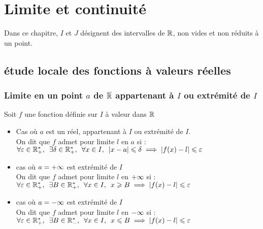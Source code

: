 \chapter{Limite et continuité}

\minitoc
\begin{nota}
    Dans ce chapitre, \(I\) et \(J\) désignent des intervalles de \(\mathbb{R}\), non vides et non réduits à un point.
\end{nota}
\section{étude locale des fonctions à valeurs réelles}
\subsection{Limite en un point \(a\) de \(\overline{\mathbb{R}}\) appartenant à \(I\) ou extrémité de \(I\)}

\begin{defi}
    Soit \(f\) une fonction définie sur \(I\) à  valeur dans \(\mathbb{R}\)
    \begin{itemize}
        \item Cas où \(a\) est un réel, appartenant à \(I\) ou extrémité de \(I\).\\
        On dit que \(f\) admet pour limite \(l\) en \(a\) si : \(\quantifs{\forall \epsilon \in \Rps;\exists\delta \in \Rps;\forall x \in I} \abs{x-a}\leq \delta \imp \abs{f(x)-l}\leq \epsilon\)
        \item cas où \(a = +\infty\) est extrémité de \(I\)\\
            On dit que \(f\) admet pour limite \(l\) en \(+\infty\) si : \(\quantifs{\forall \epsilon \in \Rps;\exists B \in \Rps;\forall x \in I} x\geq B \imp \abs{f(x)-l}\leq \epsilon\)
        \item cas où \(a = -\infty\) est extrémité de \(I\)\\
         On dit que \(f\) admet pour limite \(l\) en \(-\infty\) si : \(\quantifs{\forall \epsilon \in \Rps;\exists B \in \Rms;\forall x \in I} x\leq B \imp \abs{f(x)-l}\leq \epsilon\)
    \end{itemize}
\end{defi}

